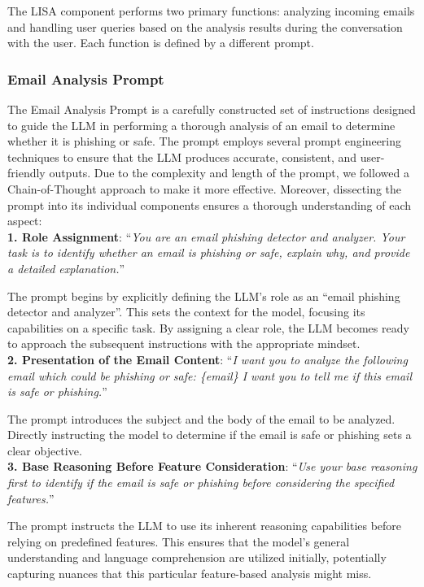The LISA component performs two primary functions: analyzing incoming emails and handling user queries based on the analysis results during the conversation with the user. Each function is defined by a different prompt.

\subsubsection{Email Analysis Prompt}
\label{sed:eap}

The Email Analysis Prompt is a carefully constructed set of instructions designed to guide the LLM in performing a thorough analysis of an email to determine whether it is phishing or safe. The prompt employs several prompt engineering techniques to ensure that the LLM produces accurate, consistent, and user-friendly outputs. Due to the complexity and length of the prompt, we followed a Chain-of-Thought approach to make it more effective. Moreover, dissecting the prompt into its individual components ensures a thorough understanding of each aspect:\\

\noindent \textbf{1. Role Assignment}: ``\textit{You are an email phishing detector and analyzer. Your task is to identify whether an email is phishing or safe, explain why, and provide a detailed explanation.}''

The prompt begins by explicitly defining the LLM’s role as an ``email phishing detector and analyzer''. This sets the context for the model, focusing its capabilities on a specific task. By assigning a clear role, the LLM becomes ready to approach the subsequent instructions with the appropriate mindset.\\

\noindent \textbf{2. Presentation of the Email Content}: ``\textit{I want you to analyze the following email which could be phishing or safe: \{email\} I want you to tell me if this email is safe or phishing.}''

The prompt introduces the subject and the body of the email to be analyzed. Directly instructing the model to determine if the email is safe or phishing sets a clear objective.\\

\noindent \textbf{3. Base Reasoning Before Feature Consideration}: ``\textit{Use your base reasoning first to identify if the email is safe or phishing before considering the specified features.}''

The prompt instructs the LLM to use its inherent reasoning capabilities before relying on predefined features. This ensures that the model’s general understanding and language comprehension are utilized initially, potentially capturing nuances that this particular feature-based analysis might miss. \\

